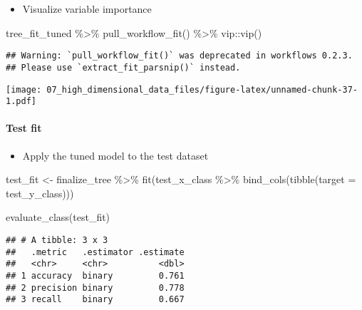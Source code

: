 \documentclass[
]{book}
\newenvironment{Shaded}{\begin{snugshade}}{\end{snugshade}}
\newcommand{\AttributeTok}[1]{\textcolor[rgb]{0.77,0.63,0.00}{#1}}
\newcommand{\FunctionTok}[1]{\textcolor[rgb]{0.00,0.00,0.00}{#1}}
\newcommand{\NormalTok}[1]{#1}
\newcommand{\OtherTok}[1]{\textcolor[rgb]{0.56,0.35,0.01}{#1}}
\newcommand{\SpecialCharTok}[1]{\textcolor[rgb]{0.00,0.00,0.00}{#1}}
\providecommand{\tightlist}{%
  \setlength{\itemsep}{0pt}\setlength{\parskip}{0pt}}
\begin{document}
\begin{itemize}
\tightlist
\item
  Visualize variable importance
\end{itemize}

\begin{Shaded}
\begin{Highlighting}[]
\NormalTok{tree\_fit\_tuned }\SpecialCharTok{\%\textgreater{}\%}
  \FunctionTok{pull\_workflow\_fit}\NormalTok{() }\SpecialCharTok{\%\textgreater{}\%}
\NormalTok{  vip}\SpecialCharTok{::}\FunctionTok{vip}\NormalTok{()}
\end{Highlighting}
\end{Shaded}

\begin{verbatim}
## Warning: `pull_workflow_fit()` was deprecated in workflows 0.2.3.
## Please use `extract_fit_parsnip()` instead.
\end{verbatim}

\texttt{[image: 07\_high\_dimensional\_data\_files/figure-latex/unnamed-chunk-37-1.pdf]}

\hypertarget{test-fit-1}{%
\paragraph{Test fit}\label{test-fit-1}}

\begin{itemize}
\tightlist
\item
  Apply the tuned model to the test dataset
\end{itemize}

\begin{Shaded}
\begin{Highlighting}[]
\NormalTok{test\_fit }\OtherTok{\textless{}{-}}\NormalTok{ finalize\_tree }\SpecialCharTok{\%\textgreater{}\%}
  \FunctionTok{fit}\NormalTok{(test\_x\_class }\SpecialCharTok{\%\textgreater{}\%} \FunctionTok{bind\_cols}\NormalTok{(}\FunctionTok{tibble}\NormalTok{(}\AttributeTok{target =}\NormalTok{ test\_y\_class)))}

\FunctionTok{evaluate\_class}\NormalTok{(test\_fit)}
\end{Highlighting}
\end{Shaded}

\begin{verbatim}
## # A tibble: 3 x 3
##   .metric   .estimator .estimate
##   <chr>     <chr>          <dbl>
## 1 accuracy  binary         0.761
## 2 precision binary         0.778
## 3 recall    binary         0.667
\end{verbatim}
\end{document}
